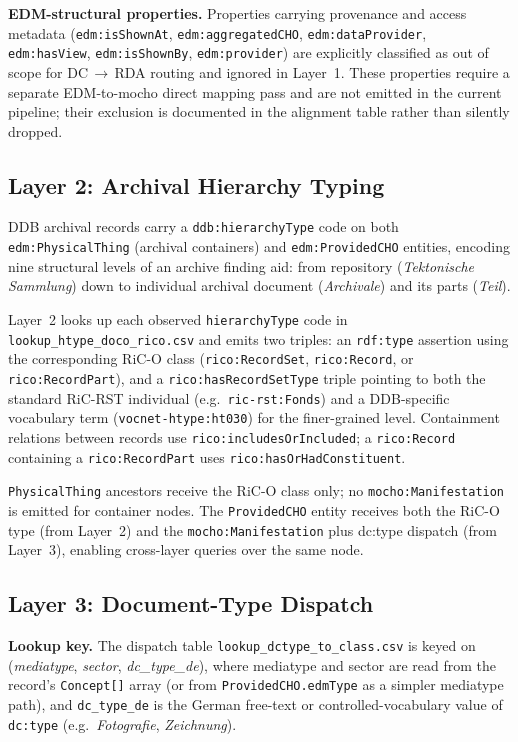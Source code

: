 \noindent
\textbf{EDM-structural properties.}
Properties carrying provenance and access metadata
(\texttt{edm:isShownAt}, \texttt{edm:aggregatedCHO},
\texttt{edm:dataProvider}, \texttt{edm:hasView}, \texttt{edm:isShownBy},
\texttt{edm:provider}) are explicitly classified as out of scope for
DC\,$\to$\,RDA routing and ignored in Layer~1.
These properties require a separate EDM-to-mocho direct mapping pass and are
not emitted in the current pipeline; their exclusion is documented in the
alignment table rather than silently dropped.

\subsection{Layer 2: Archival Hierarchy Typing}

DDB archival records carry a \texttt{ddb:hierarchyType} code on both
\texttt{edm:PhysicalThing} (archival containers) and \texttt{edm:ProvidedCHO}
entities, encoding nine structural levels of an archive finding aid:
from repository (\textit{Tektonische Sammlung}) down to individual archival
document (\textit{Archivale}) and its parts (\textit{Teil}).

Layer~2 looks up each observed \texttt{hierarchyType} code in
\texttt{lookup\_htype\_doco\_rico.csv} and emits two triples:
an \texttt{rdf:type} assertion using the corresponding RiC-O class
(\texttt{rico:RecordSet}, \texttt{rico:Record}, or \texttt{rico:RecordPart}),
and a \texttt{rico:hasRecordSetType} triple pointing to both the standard
RiC-RST individual (e.g.\ \texttt{ric-rst:Fonds}) and a DDB-specific
vocabulary term (\texttt{vocnet-htype:ht030}) for the finer-grained level.
Containment relations between records use \texttt{rico:includesOrIncluded};
a \texttt{rico:Record} containing a \texttt{rico:RecordPart} uses
\texttt{rico:hasOrHadConstituent}.

\texttt{PhysicalThing} ancestors receive the RiC-O class only; no
\texttt{mocho:Manifestation} is emitted for container nodes.
The \texttt{ProvidedCHO} entity receives both the RiC-O type (from Layer~2)
and the \texttt{mocho:Manifestation} plus dc:type dispatch (from Layer~3),
enabling cross-layer queries over the same node.

\subsection{Layer 3: Document-Type Dispatch}

\noindent
\textbf{Lookup key.}
The dispatch table \texttt{lookup\_dctype\_to\_class.csv} is keyed on
(\textit{mediatype}, \textit{sector}, \textit{dc\_type\_de}), where mediatype
and sector are read from the record's \texttt{Concept[]} array
(or from \texttt{ProvidedCHO.edmType} as a simpler mediatype path),
and \texttt{dc\_type\_de} is the German free-text or controlled-vocabulary
value of \texttt{dc:type} (e.g.\ \textit{Fotografie}, \textit{Zeichnung}).

